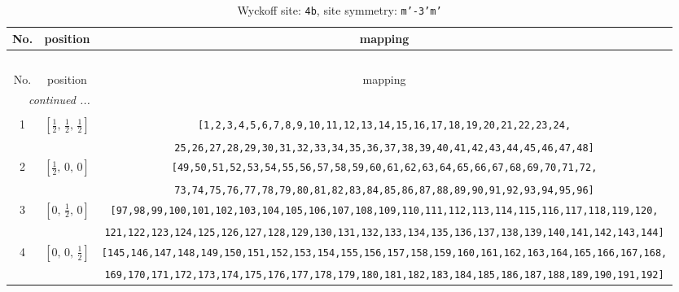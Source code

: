 \documentclass[fleqn,8pt]{jsarticle}
\begin{document}
\begin{longtable}{ccc}
\caption{Wyckoff site: {\tt 4b}, site symmetry: {\tt m'-3'm'}}
 \\
 \hline \hline
No. & position & mapping \\ \hline \endfirsthead

\multicolumn{2}{l}{\tablename\ \thetable{}} \\
 \hline \hline
No. & position & mapping \\ \hline \endhead

 \hline \hline
\multicolumn{2}{r}{\footnotesize\it continued ...} \\ \endfoot

 \hline \hline
\multicolumn{2}{r}{} \\ \endlastfoot

1 & $\left[ \frac{1}{2},\, \frac{1}{2},\, \frac{1}{2} \right]$ & {\tt [1,2,3,4,5,6,7,8,9,10,11,12,13,14,15,16,17,18,19,20,21,22,23,24,} \\ \hline
 &  & {\tt 25,26,27,28,29,30,31,32,33,34,35,36,37,38,39,40,41,42,43,44,45,46,47,48]} \\ \hline
2 & $\left[ \frac{1}{2},\, 0,\, 0 \right]$ & {\tt [49,50,51,52,53,54,55,56,57,58,59,60,61,62,63,64,65,66,67,68,69,70,71,72,} \\ \hline
 &  & {\tt 73,74,75,76,77,78,79,80,81,82,83,84,85,86,87,88,89,90,91,92,93,94,95,96]} \\ \hline
3 & $\left[ 0,\, \frac{1}{2},\, 0 \right]$ & {\tt [97,98,99,100,101,102,103,104,105,106,107,108,109,110,111,112,113,114,115,116,117,118,119,120,} \\ \hline
 &  & {\tt 121,122,123,124,125,126,127,128,129,130,131,132,133,134,135,136,137,138,139,140,141,142,143,144]} \\ \hline
4 & $\left[ 0,\, 0,\, \frac{1}{2} \right]$ & {\tt [145,146,147,148,149,150,151,152,153,154,155,156,157,158,159,160,161,162,163,164,165,166,167,168,} \\ \hline
 &  & {\tt 169,170,171,172,173,174,175,176,177,178,179,180,181,182,183,184,185,186,187,188,189,190,191,192]} \\
\end{longtable}
\renewcommand{\arraystretch}{1.2}
\end{document}
